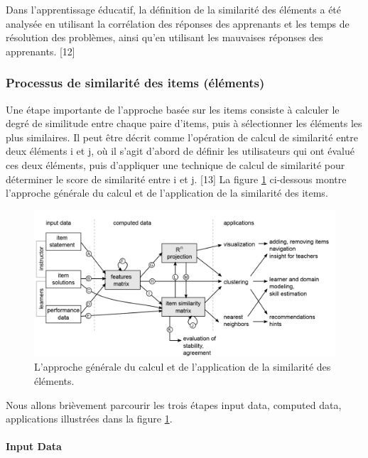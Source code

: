 Dans l'apprentissage éducatif, la définition de la similarité des éléments a été analysée en utilisant la corrélation des réponses des apprenants et les temps de résolution des problèmes, ainsi qu'en utilisant les mauvaises réponses des apprenants. [12]

\subsubsection{Processus de similarité des items (éléments)}
Une étape importante de l'approche basée sur les items consiste à calculer le degré de similitude entre chaque paire d’items, puis à sélectionner les éléments les plus similaires. Il peut être décrit comme l'opération de calcul de similarité entre deux éléments i et j, où il s'agit d'abord de définir les utilisateurs qui ont évalué ces deux éléments, puis d'appliquer une technique de calcul de similarité pour déterminer le score de similarité entre i et j. [13] La figure \ref{calcul_application_similarity} ci-dessous montre l'approche générale du calcul et de l'application de la similarité des items.

\begin{figure}[H]
	\begin{center}
		\includegraphics[width=\textwidth]{images/chapitre3/calcul_application_similarity.png}
	\end{center}
\caption{L'approche générale du calcul et de l'application de la similarité des éléments.}
\label{calcul_application_similarity}
\end{figure}

Nous allons brièvement parcourir les trois étapes input data, computed data, applications illustrées dans la figure \ref{calcul_application_similarity}. 
\paragraph{Input Data}

